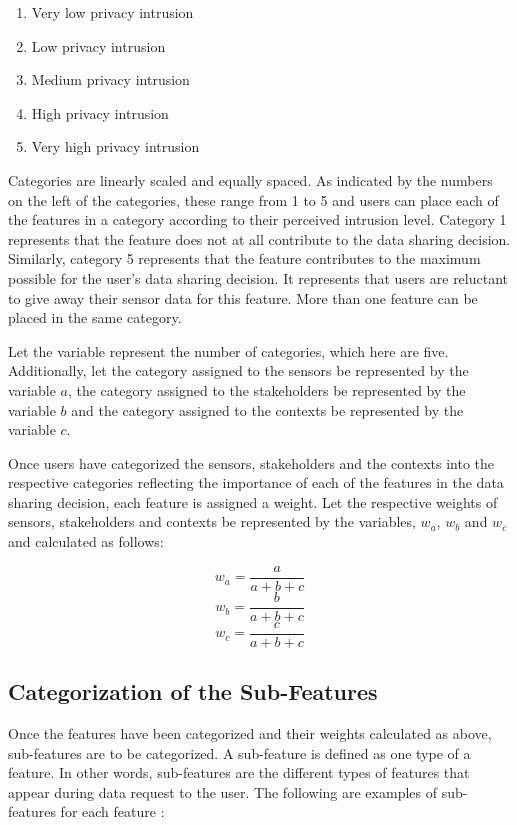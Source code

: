 \begin{enumerate}
\item Very low privacy intrusion
\item Low privacy intrusion
\item Medium privacy intrusion
\item High privacy intrusion
\item Very high privacy intrusion
\end{enumerate}

Categories are linearly scaled and equally spaced. As indicated by the numbers on the left of the categories, these range from 1 to 5 and users can place each of the features in a category according to their perceived intrusion level. Category 1 represents that the feature does not at all contribute to the data sharing decision. Similarly, category 5 represents that the feature contributes to the maximum possible for the user's data sharing decision. It represents that users are reluctant to give away their sensor data for this feature. More than one feature can be placed in the same category.

Let the variable \numcategories represent the number of categories, which here are five. Additionally, let the category assigned to the sensors be represented by the variable $a$, the category assigned to the stakeholders be represented by the variable $b$ and the category assigned to the contexts be represented by the variable $c$.

Once users have categorized the sensors, stakeholders and the contexts into the respective categories reflecting the importance of each of the features in the data sharing decision, each feature is assigned a weight. Let the respective weights of sensors, stakeholders and contexts be represented by the variables, $w_{a}$, $w_{b}$ and $w_{c}$ and calculated as follows:

\begin{equation}
   w_{a} = \frac{a}{a+b+c} 
\end{equation}
\begin{equation}
   w_{b} = \frac{b}{a+b+c}   
\end{equation}
\begin{equation}
   w_{c} = \frac{c}{a+b+c}   
\end{equation}

\subsection{Categorization of the Sub-Features}
Once the features have been categorized and their weights calculated as above, sub-features are to be categorized. A sub-feature
is defined as one type of a feature. In other words, sub-features are the different types of features that appear during data request to the user. The following are examples of sub-features for each feature :

